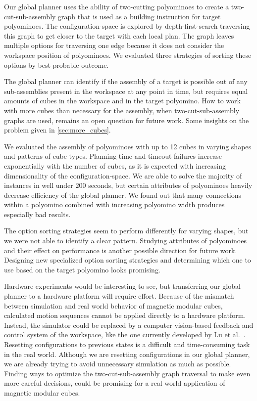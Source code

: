 Our global planner uses the ability of two-cutting polyominoes to create a two-cut-sub-assembly graph that is used as a building instruction for target polyominoes.
The configuration-space is explored by depth-first-search traversing this graph to get closer to the target with each local plan.
The graph leaves multiple options for traversing one edge because it does not consider the workspace position of polyominoes. 
We evaluated three strategies of sorting these options by best probable outcome.

\newpage

The global planner can identify if the assembly of a target is possible out of any sub-assemblies present in the workspace at any point in time, but requires equal amounts of cubes in the workspace and in the target polyomino.
How to work with more cubes than necessary for the assembly, when two-cut-sub-assembly graphs are used, remains an open question for future work.
Some insights on the problem given in \autoref{sec:more_cubes}.

We evaluated the assembly of polyominoes with up to 12 cubes in varying shapes and patterns of cube types.
Planning time and timeout failures increase exponentially with the number of cubes, as it is expected with increasing dimensionality of the configuration-space.
We are able to solve the majority of instances in well under $200$ seconds, but certain attributes of polyominoes heavily decrease efficiency of the global planner.
We found out that many connections within a polyomino combined with increasing polyomino width produces especially bad results.

The option sorting strategies seem to perform differently for varying shapes, but we were not able to identify a clear pattern.
Studying attributes of polyominoes and their effect on performance is another possible direction for future work.
Designing new specialized option sorting strategies and determining which one to use based on the target polyomino looks promising. 

Hardware experiments would be interesting to see, but transferring our global planner to a hardware platform will require effort.
Because of the mismatch between simulation and real world behavior of magnetic modular cubes, calculated motion sequences cannot be applied directly to a hardware platform.
Instead, the simulator could be replaced by a computer vision-based feedback and control system of the workspace, like the one currently developed by Lu et al.\ \cite{Lu2023}.
Resetting configurations to previous states is a difficult and time-consuming task in the real world.
Although we are resetting configurations in our global planner, we are already trying to avoid unnecessary simulation as much as possible.
Finding ways to optimize the two-cut-sub-assembly graph traversal to make even more careful decisions, could be promising for a real world application of magnetic modular cubes.






